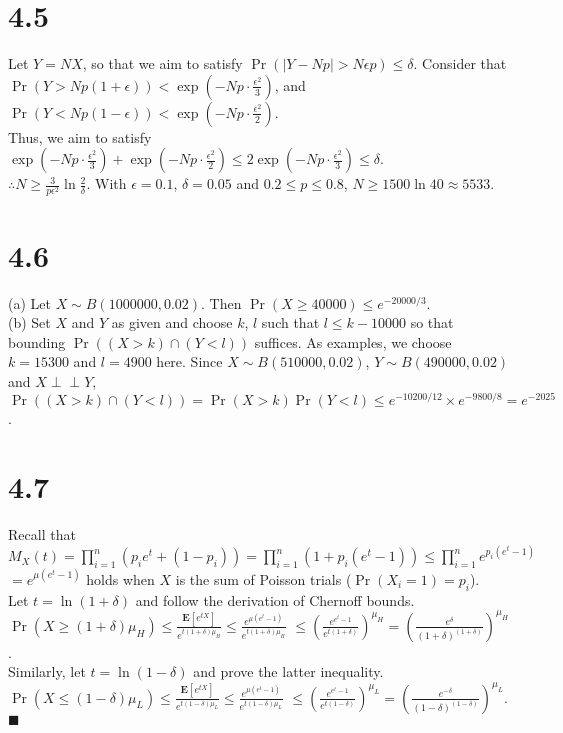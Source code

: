 \documentclass{article}
\begin{document}
\section*{4.5}
Let $Y=NX$, so that we aim to satisfy $\Pr(|Y-Np|>N\epsilon p) \leq \delta$. Consider that\\
$\Pr(Y>Np(1+\epsilon)) < \exp(-Np\cdot \frac{\epsilon^2}{3})$, and $\Pr(Y<Np(1-\epsilon)) < \exp(-Np\cdot \frac{\epsilon^2}{2})$.\\
Thus, we aim to satisfy $\exp(-Np\cdot \frac{\epsilon^2}{3})+\exp(-Np\cdot \frac{\epsilon^2}{2}) \leq 2\exp(-Np\cdot \frac{\epsilon^2}{3}) \leq \delta$.\\
$\therefore N \geq \frac{3}{p\epsilon^2} \ln \frac{2}{\delta}$. With $\epsilon=0.1$, $\delta=0.05$ and $0.2 \leq p \leq 0.8$, $N\geq1500\ln40\approx5533$.
\section*{4.6}
(a) Let $X\sim B(1000000, 0.02)$. Then $\Pr(X\geq 40000) \leq e^{-20000/3}$.\\
(b) Set $X$ and $Y$ as given and choose $k$, $l$ such that $l \leq k - 10000$ so that bounding $\Pr((X>k)\cap(Y<l))$ suffices.
As examples, we choose $k=15300$ and $l=4900$ here.
Since $X\sim B(510000, 0.02)$, $Y\sim B(490000,0.02)$ and $X \perp\!\!\!\perp Y$, $\Pr((X>k)\cap(Y<l)) = \Pr(X>k)\Pr(Y<l) \leq e^{-10200/12}\times e^{-9800/8} = e^{-2025}$.
\section*{4.7}
Recall that $M_X(t)=\prod\limits_{i=1}^n (p_ie^t + (1-p_i)) = \prod\limits_{i=1}^n (1+p_i(e^t-1))\leq \prod\limits_{i=1}^ne^{p_i(e^t-1)}$\\
$=e^{\mu(e^t-1)}$ holds when $X$ is the sum of Poisson trials ($\Pr(X_i=1)=p_i$).\\
Let $t=\ln (1+\delta)$ and follow the derivation of Chernoff bounds.\\
$\Pr(X\geq (1+\delta)\mu_H) \leq \frac{\textbf{E}[e^{tX}]}{e^{t(1+\delta)\mu_H}}\leq\frac{e^{\mu(e^t-1)}}{e^{t(1+\delta)\mu_H}}$
$\leq \left( \frac{e^{e^t-1}}{e^{t(1+\delta)}}\right)^{\mu_H}=\left( \frac{e^\delta}{(1+\delta)^{(1+\delta)}}\right)^{\mu_H}$.\\
Similarly, let $t=\ln (1-\delta)$ and prove the latter inequality.\\
$\Pr(X\leq (1-\delta)\mu_L) \leq \frac{\textbf{E}[e^{tX}]}{e^{t(1-\delta)\mu_L}}\leq\frac{e^{\mu(e^t-1)}}{e^{t(1-\delta)\mu_L}}$
$\leq \left( \frac{e^{e^t-1}}{e^{t(1-\delta)}}\right)^{\mu_L}=\left( \frac{e^{-\delta}}{(1-\delta)^{(1-\delta)}}\right)^{\mu_L}$. $\blacksquare$
\end{document}
